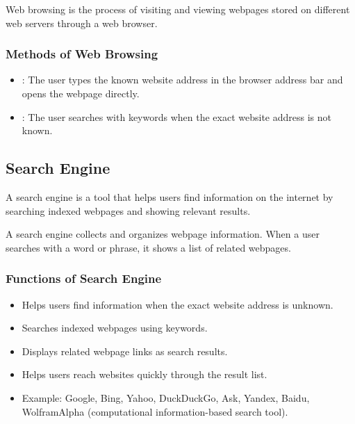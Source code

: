 \begin{definitionbox}
Web browsing is the process of visiting and viewing webpages stored on different web servers through a web browser.
\end{definitionbox}

\subsubsection{Methods of Web Browsing}

\begin{itemize}
    \item {}: The user types the known website address in the browser address bar and opens the webpage directly.
    \item {}: The user searches with keywords when the exact website address is not known.
\end{itemize}


\subsection{Search Engine}

\begin{definitionbox}
A search engine is a tool that helps users find information on the internet by searching indexed webpages and showing relevant results.
\end{definitionbox}

A search engine collects and organizes webpage information. When a user searches with a word or phrase, it shows a list of related webpages.

\subsubsection{Functions of Search Engine}

\begin{itemize}
    \item Helps users find information when the exact website address is unknown.
    \item Searches indexed webpages using keywords.
    \item Displays related webpage links as search results.
    \item Helps users reach websites quickly through the result list.
    \item Example: Google, Bing, Yahoo, DuckDuckGo, Ask, Yandex, Baidu, WolframAlpha (computational information-based search tool).
\end{itemize}

